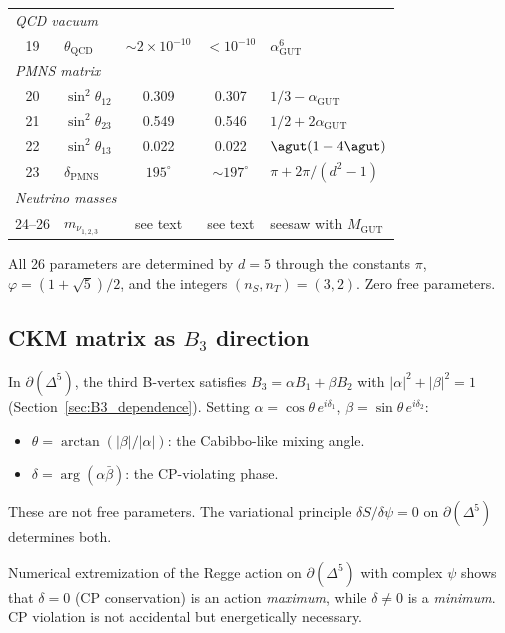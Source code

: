 \begin{center}
\begin{tabular}{clccl}
\multicolumn{5}{l}{\emph{QCD vacuum}} \\
19 & $\theta_\text{QCD}$ & $\sim 2\!\times\! 10^{-10}$ & $< 10^{-10}$ & $\alpha_\text{GUT}^6$ \\
\hline
\multicolumn{5}{l}{\emph{PMNS matrix}} \\
20 & $\sin^2\theta_{12}$ & 0.309 & 0.307 & $1/3 - \alpha_\text{GUT}$ \\
21 & $\sin^2\theta_{23}$ & 0.549 & 0.546 & $1/2 + 2\alpha_\text{GUT}$ \\
22 & $\sin^2\theta_{13}$ & 0.022 & 0.022 & $\agut(1-4\agut)$ \\
23 & $\delta_\text{PMNS}$ & $195^\circ$ & $\sim 197^\circ$ & $\pi + 2\pi/(d^2\!-\!1)$ \\
\hline
\multicolumn{5}{l}{\emph{Neutrino masses}} \\
24--26 & $m_{\nu_{1,2,3}}$ & see text & see text & seesaw with $M_\text{GUT}$ \\
\hline
\end{tabular}
\end{center}

\medskip
\noindent All 26 parameters are determined by $d = 5$ through the constants $\pi$, $\varphi = (1+\sqrt{5})/2$, and the integers $(n_S, n_T) = (3, 2)$. Zero free parameters.

\subsection{CKM matrix as $B_3$ direction}
\label{sec:ckm_geometry}

In $\partial(\Delta^5)$, the third B-vertex satisfies $B_3 = \alpha B_1 + \beta B_2$ with $|\alpha|^2 + |\beta|^2 = 1$ (Section~\ref{sec:B3_dependence}).  Setting $\alpha = \cos\theta\,e^{i\delta_1}$, $\beta = \sin\theta\,e^{i\delta_2}$:

\begin{itemize}
\item $\theta = \arctan(|\beta|/|\alpha|)$: the Cabibbo-like mixing angle.
\item $\delta = \arg(\alpha\bar\beta)$: the CP-violating phase.
\end{itemize}

These are not free parameters.  The variational principle $\delta S/\delta\psi = 0$ on $\partial(\Delta^5)$ determines both.

\begin{proposition}
\label{prop:cp}
Numerical extremization of the Regge action on $\partial(\Delta^5)$ with complex $\psi$ shows that $\delta = 0$ (CP conservation) is an action \emph{maximum}, while $\delta \neq 0$ is a \emph{minimum}.  CP violation is not accidental but energetically necessary.
\end{proposition}

